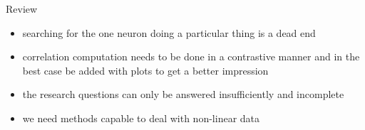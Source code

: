 \begin{frame}{Review}
	\begin{itemize}
		\item searching for the one neuron doing a particular thing is a dead end
		\item correlation computation needs to be done in a contrastive manner and in the best case be added with plots to get a better impression
		\item the research questions can only be answered insufficiently and incomplete
		\item we need methods capable to deal with non-linear data
	\end{itemize}
\end{frame}